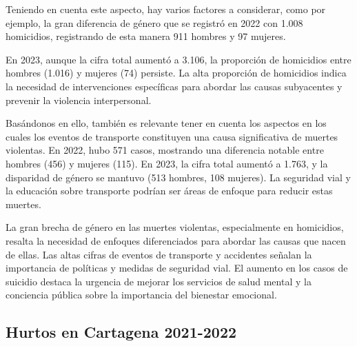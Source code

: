 \documentclass[letterpaper, 12pt]{article}
\begin{document}

Teniendo en cuenta este aspecto, hay varios factores a
considerar, como por ejemplo, la gran diferencia de género
que se registró en 2022 con 1.008 homicidios, registrando
de esta manera 911 hombres y 97 mujeres.

En 2023, aunque la cifra total aumentó a 3.106, la
proporción de homicidios entre hombres (1.016) y mujeres
(74) persiste. La alta proporción de homicidios indica la
necesidad de intervenciones específicas para abordar las
causas subyacentes y prevenir la violencia interpersonal.

Basándonos en ello, también es relevante tener en cuenta
los aspectos en los cuales los eventos de transporte
constituyen una causa significativa de muertes violentas.
En 2022, hubo 571 casos, mostrando una diferencia notable
entre hombres (456) y mujeres (115). En 2023, la cifra
total aumentó a 1.763, y la disparidad de género se mantuvo
(513 hombres, 108 mujeres). La seguridad vial y la
educación sobre transporte podrían ser áreas de enfoque
para reducir estas muertes. %


La gran brecha de género en las muertes violentas,
especialmente en homicidios, resalta la necesidad de
enfoques diferenciados para abordar las causas que nacen de
ellas. Las altas cifras de eventos de transporte y
accidentes señalan la importancia de políticas y medidas de
seguridad vial. El aumento en los casos de suicidio destaca
la urgencia de mejorar los servicios de salud mental y la
conciencia pública sobre la importancia del bienestar
emocional. %



\subsection*{Hurtos en Cartagena 2021-2022}
\end{document}
